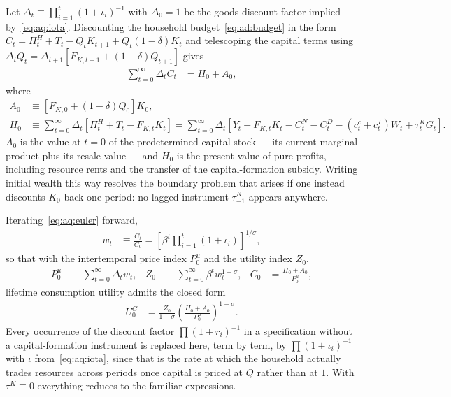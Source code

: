  Let $\Delta_t\equiv\prod_{i=1}^{t}\left(1+\iota_i\right)^{-1}$ with $\Delta_0=1$ be the goods discount factor implied by~\eqref{eq:aq:iota}. Discounting the household budget~\eqref{eq:ad:budget} in the form $C_t=\Pi^H_t+T_t-Q_tK_{t+1}+Q_t\left(1-\delta\right)K_t$ and telescoping the capital terms using $\Delta_tQ_t=\Delta_{t+1}\left[F_{K,t+1}+\left(1-\delta\right)Q_{t+1}\right]$ gives
\begin{align}
\sum_{t=0}^{\infty}\Delta_tC_t &= H_0+A_0,
\label{eq:aq:lifetime-budget}
\end{align}
where
\begin{align}
A_0 &\equiv \left[F_{K,0}+\left(1-\delta\right)Q_0\right]K_0,
\label{eq:aq:A0}
\\
H_0 &\equiv \sum_{t=0}^{\infty}\Delta_t\left[\Pi^H_t+T_t-F_{K,t}K_t\right]
= \sum_{t=0}^{\infty}\Delta_t\left[Y_t-F_{K,t}K_t-C^N_t-C^D_t-\left(c^c_t+c^T_t\right)W_t+\tau^K_tG_t\right].
\label{eq:aq:H0}
\end{align}
$A_0$ is the value at $t=0$ of the predetermined capital stock --- its current marginal product plus its resale value --- and $H_0$ is the present value of pure profits, including resource rents and the transfer of the capital-formation subsidy. Writing initial wealth this way resolves the boundary problem that arises if one instead discounts $K_0$ back one period: no lagged instrument $\tau^K_{-1}$ appears anywhere.

 Iterating~\eqref{eq:aq:euler} forward,
\begin{align}
w_t &\equiv \frac{C_t}{C_0}=\left[\beta^t\prod_{i=1}^{t}\left(1+\iota_i\right)\right]^{1/\sigma},
\label{eq:aq:weights}
\end{align}
so that with the intertemporal price index $P^u_0$ and the utility index $Z_0$,
\begin{align}
P^u_0 &\equiv \sum_{t=0}^{\infty}\Delta_tw_t,
&
Z_0 &\equiv \sum_{t=0}^{\infty}\beta^tw_t^{1-\sigma},
&
C_0 &= \frac{H_0+A_0}{P^u_0},
\label{eq:aq:indices}
\end{align}
lifetime consumption utility admits the closed form
\begin{align}
U^C_0 &= \frac{Z_0}{1-\sigma}\left(\frac{H_0+A_0}{P^u_0}\right)^{1-\sigma}.
\label{eq:aq:UC}
\end{align}
Every occurrence of the discount factor $\prod\left(1+r_i\right)^{-1}$ in a specification without a capital-formation instrument is replaced here, term by term, by $\prod\left(1+\iota_i\right)^{-1}$ with $\iota$ from~\eqref{eq:aq:iota}, since that is the rate at which the household actually trades resources across periods once capital is priced at $Q$ rather than at $1$. With $\tau^K\equiv0$ everything reduces to the familiar expressions.

